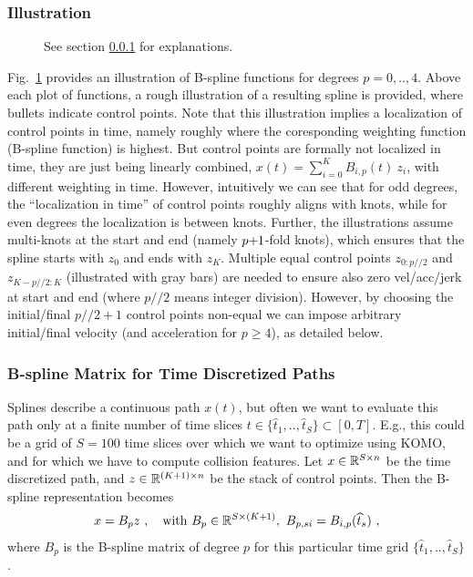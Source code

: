 \subsubsection{Illustration}\label{secIll}

\begin{figure}
\caption{\label{figBsplines}
See section \ref{secIll} for explanations.}
\end{figure}

\renewcommand{\div}{/\!\!/}

Fig.~\ref{figBsplines} provides an illustration of B-spline functions
for degrees $p=0,..,4$. Above each plot of functions, a rough
illustration of a resulting spline is provided, where bullets indicate
control points. Note that this illustration implies a localization of
control points in time, namely roughly where the coresponding
weighting function (B-spline function) is highest. But control points
are formally not localized in time, they are just being linearly
combined, $x(t) = \sum_{i=0}^K B_{i,p}(t)~ z_i$, with different
weighting in time. However, intuitively we can see that for odd
degrees, the ``localization in time'' of control points roughly aligns
with knots, while for even degrees the localization is between
knots. Further, the illustrations assume multi-knots at the start and
end (namely $p{{\hspace*{-.0pt}\text{\rm +}\hspace*{-.5pt}}1}$-fold knots), which ensures that the spline starts
with $z_0$ and ends with $z_K$. Multiple equal control points
$z_{0:p\div2}$ and $z_{K-p\div2:K}$ (illustrated with gray bars) are
needed to ensure also zero vel/acc/jerk at start and end (where
$p\div2$ means integer division). However, by choosing the
initial/final $p\div2+1$ control points non-equal we can impose
arbitrary initial/final velocity (and acceleration for $p\ge 4$), as
detailed below.


\subsubsection{B-spline Matrix for Time Discretized Paths}

Splines describe a continuous path $x(t)$, but often we want to
evaluate this path only at a finite number of time slices $t\in \{\hat
t_1,..,\hat t_S\} \subset [0,T]$. E.g., this could be a grid of
$S=100$ time slices over which we want to optimize using KOMO, and for
which we have to compute collision features. Let $x \in {\mathbb{R}}^{S \times
n}$ be the time discretized path, and $z \in{\mathbb{R}}^{(K{{\hspace*{-.0pt}\text{\rm +}\hspace*{-.5pt}}1})\times n}$ be
the stack of control points. Then the B-spline representation becomes
\begin{align}
x = B_p z ~,\quad \text{with } B_p\in{\mathbb{R}}^{S\times (K{{\hspace*{-.0pt}\text{\rm +}\hspace*{-.5pt}}1})},~ B_{p,si} = B_{i,p}(\widehat t_s) ~,
\end{align}
where $B_p$ is the B-spline matrix of degree $p$ for this particular time grid $\{\hat t_1,..,\hat t_S\}$.

